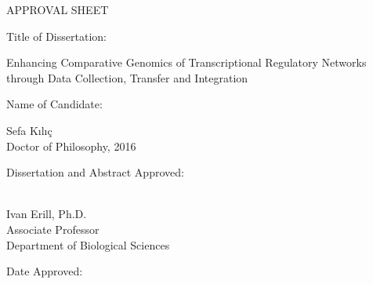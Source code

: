 \newpage
\begin{titlepage}
\vspace{0.6in}
\begin{singlespace}

\begin{center}
\vspace{0.1in}
\large{APPROVAL SHEET}
\bigskip \bigskip
\end{center}

\begin{flushleft} {Title of Dissertation:}{\hspace{3mm}}
  \parbox[t]{4.3in}{Enhancing Comparative Genomics
    of Transcriptional Regulatory Networks through Data Collection, Transfer
    and Integration}

\vspace{0.5in}
{Name of Candidate:}{\hspace{3mm}} \parbox[t]{2in}{Sefa Kılıç \\ Doctor of Philosophy, 2016}
\end{flushleft}

\vspace{0.5in}

\begin{flushleft}
{Dissertation and Abstract Approved:}{\hspace{3mm}}
\parbox[t]{2.5in}{\underline{\hspace{2.0in}}\\
	Ivan Erill, Ph.D.\\
	Associate Professor \\
	Department of Biological Sciences}
\end{flushleft}

\vspace{0.8in}

\begin{flushleft}
{Date Approved:}{\hspace{3mm}} \underline{\hspace{2in}}\\
\end{flushleft}

\end{singlespace}
\end{titlepage}
\par\vfil
